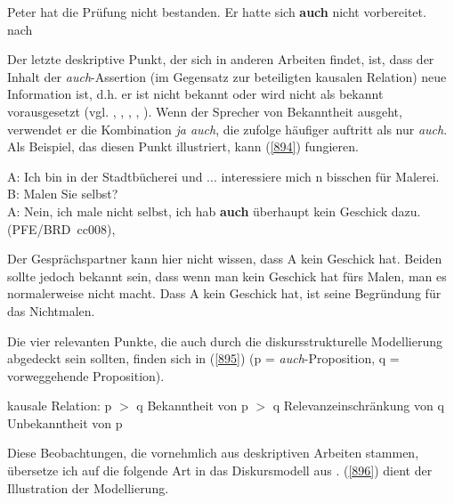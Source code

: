 {\begin{exe}
	\ex\label{893}
	Peter hat die Prüfung nicht bestanden. Er hatte sich \textbf{auch} nicht vorbereitet.
	\newline
	\hbox{}\hfill\hbox {nach \citet[227]{Karagjosova2004}}
\end{exe}
Der letzte deskriptive Punkt, der sich in anderen Arbeiten findet, ist, dass der Inhalt der \textit{auch}-Assertion (im Gegensatz zur beteiligten kausalen Relation) neue Information ist, d.h. er ist nicht bekannt oder wird nicht als bekannt vorausgesetzt (vgl. \citealt[215]{Franck1980}, \citealt[156]{Thurmair1989}, \citealt[71]{Koenig1997}, \citealt[343]{Karagjosova2004}, \citealt[73]{Kwon2005}). Wenn der Sprecher von Bekanntheit ausgeht, verwendet er die Kombination \textit{ja auch}, die \citet[156]{Thurmair1989} zufolge häufiger auftritt als nur \textit{auch}. Als Beispiel, das diesen Punkt illustriert, kann (\ref{894}) fungieren.

\begin{exe}
	\ex\label{894}
	A: Ich bin in der Stadtbücherei und ... interessiere mich  n bisschen für Malerei.\\
	B: Malen Sie selbst?\\
	A: Nein, ich male nicht selbst, ich hab \textbf{auch} überhaupt kein Geschick dazu.
	\newline
	\hbox{}\hfill\hbox {(PFE/BRD cc008), \citet[69]{Kwon2005}}
\end{exe}
Der Gesprächspartner kann hier nicht wissen, dass A kein Geschick hat. Beiden sollte jedoch bekannt sein, dass wenn man kein Geschick hat fürs Malen, man es normalerweise nicht macht. Dass A kein Geschick hat, ist seine Begründung für das Nichtmalen.

Die vier relevanten Punkte, die auch durch die diskursstrukturelle Modellierung abgedeckt sein sollten, finden sich in (\ref{895}) (p = \textit{auch}-Proposition, q = vorweggehende Proposition).

\begin{exe}
	\ex\label{895} 
		\begin{xlist}	
			\ex\label{895a} kausale Relation: p $>$ q
			\ex\label{896b} Bekanntheit von p $>$ q
			\ex\label{896c} Relevanzeinschränkung von q
			\ex\label{896d} Unbekanntheit von p			
		\end{xlist}
\end{exe}
Diese Beobachtungen, die vornehmlich aus deskriptiven Arbeiten stammen, übersetze ich auf die folgende Art in das Diskursmodell aus \citet{Farkas2010}. (\ref{896}) dient der Illustration der Modellierung.

}
